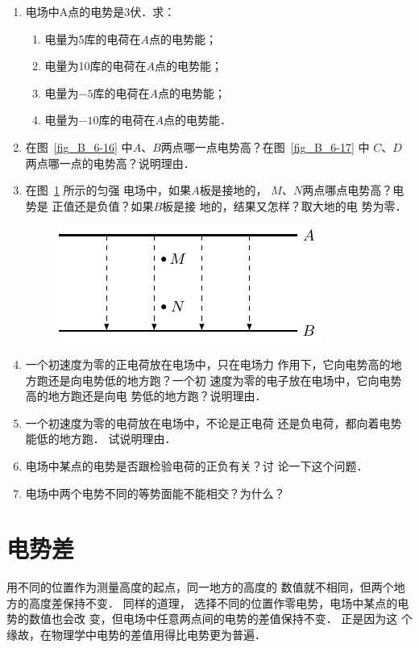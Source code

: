 \begin{enumerate}
    \item 电场中A点的电势是3伏．求：
    \begin{enumerate}
        \item 电量为5库的电荷在$A$点的电势能；
        \item 电量为10库的电荷在$A$点的电势能；
        \item 电量为$-5$库的电荷在$A$点的电势能；
        \item 电量为$-10$库的电荷在$A$点的电势能．
    \end{enumerate}
    \item 在图~\ref{fig_B_6-16} 中$A$、$B$两点哪一点电势高？在图~\ref{fig_B_6-17} 中
$C$、$D$两点哪一点的电势高？说明理由．

\item 在图~\ref{fig_B_6-23} 所示的匀强
电场中，如果$A$板是接地的，
$M$、$N$两点哪点电势高？电势是
正值还是负值？如果$B$板是接
地的，结果又怎样？取大地的电
势为零．

\begin{figure}[htbp]
    \centering
    \includegraphics{fig/B/6-23.pdf}
    \caption{}\label{fig_B_6-23}
\end{figure}    

\item 一个初速度为零的正电荷放在电场中，只在电场力
作用下，它向电势高的地方跑还是向电势低的地方跑？一个初
速度为零的电子放在电场中，它向电势高的地方跑还是向电
势低的地方跑？说明理由．
\item 一个初速度为零的电荷放在电场中，不论是正电荷
还是负电荷，都向着电势能低的地方跑．
试说明理由．
\item 电场中某点的电势是否跟检验电荷的正负有关？讨
论一下这个问题．
\item 电场中两个电势不同的等势面能不能相交？为什么？
\end{enumerate}

\section{电势差}
用不同的位置作为测量高度的起点，同一地方的高度的
数值就不相同，但两个地方的高度差保持不变．
同样的道理，
选择不同的位置作零电势，电场中某点的电势的数值也会改
变，但电场中任意两点间的电势的差值保持不变．
正是因为这
个缘故，在物理学中电势的差值用得比电势更为普遍．

